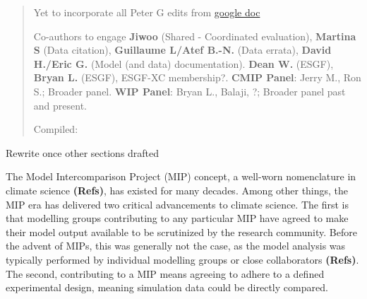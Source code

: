 \documentclass[gmd, preprint]{copernicus}
\def\cred#1{{\color{red}#1}}
\begin{document}
\begin{abstract}
\cred{
Yet to incorporate all Peter G edits from \href{https://docs.google.com/document/d/1l9e0kBbXHG55jFroicRbM-_gaRhTVulMr_F6S3aLQGQ/edit}{google doc}
}


\cred{Co-authors to engage}
\textbf{Jiwoo} (Shared - Coordinated evaluation), \textbf{Martina S} (Data citation), \textbf{Guillaume L/Atef B.-N.} (Data errata), \textbf{David H./Eric G.} (Model (and data) documentation).
\textbf{Dean W.} (ESGF), \textbf{Bryan L.} (ESGF), ESGF-XC membership?.
\textbf{CMIP Panel}: Jerry M., Ron S.; Broader panel.
\textbf{WIP Panel}: Bryan L., Balaji, ?; Broader panel past and present.

{Compiled: \DTMnow}

\end{abstract}



\introduction  %
\cred{Rewrite once other sections drafted}

The Model Intercomparison Project (MIP) concept, a well-worn nomenclature in climate science \cred{\textbf{(Refs)}}, has existed for many decades. Among other things, the MIP era has delivered two critical advancements to climate science. The first is that modelling groups contributing to any particular MIP have agreed to make their model output available to be scrutinized by the research community. Before the advent of MIPs, this was generally not the case, as the model analysis was typically performed by individual modelling groups or close collaborators \cred{\textbf{(Refs)}}. The second, contributing to a MIP means agreeing to adhere to a defined experimental design, meaning simulation data could be directly compared.
\end{document}
